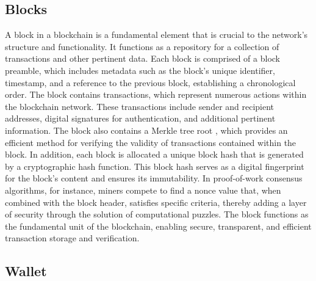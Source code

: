 \documentclass[../../Main.tex]{subfiles}
\begin{document}
\subsection{Blocks}
\label{section:2.1.2}
A block in a blockchain is a fundamental element that is crucial to the network's structure and functionality. It functions as a repository for a collection of transactions and other pertinent data. Each block is comprised of a block preamble, which includes metadata such as the block's unique identifier, timestamp, and a reference to the previous block, establishing a chronological order. The block contains transactions, which represent numerous actions within the blockchain network. These transactions include sender and recipient addresses, digital signatures for authentication, and additional pertinent information. The block also contains a Merkle tree root \cite{merkle1987digital}, which provides an efficient method for verifying the validity of transactions contained within the block. In addition, each block is allocated a unique block hash that is generated by a cryptographic hash function. This block hash serves as a digital fingerprint for the block's content and ensures its immutability. In proof-of-work consensus algorithms, for instance, miners compete to find a nonce value that, when combined with the block header, satisfies specific criteria, thereby adding a layer of security through the solution of computational puzzles. The block functions as the fundamental unit of the blockchain, enabling secure, transparent, and efficient transaction storage and verification.
\subsection{Wallet}
\label{section:2.1.3}
\end{document}
